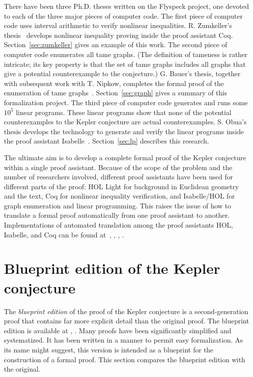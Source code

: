 \documentclass[11pt]{amsart}
\begin{document}
There have been three Ph.D. theses written on the Flyspeck
project, one devoted to each of the three major pieces of computer code.
The first piece of computer code uses interval arithmetic to verify nonlinear inequalities.  R. Zumkeller's thesis~\cite{roland-thesis} develops nonlinear inequality proving inside the proof assistant Coq.  Section~\ref{sec:zumkeller} gives an example of this work.
The second piece of computer code enumerates all tame graphs.
(The definition of tameness is rather intricate; its key property is that the set of tame graphs 
includes all graphs that give a potential counterexample to the conjecture.)
G. Bauer's thesis, together with subsequent 
work with T. Nipkow, completes the formal
proof of the enumeration of tame graphs~\cite{NipkowBS-IJCAR06}.
Section~\ref{sec:graph} gives a summary of this formalization project.
The third piece of computer code generates and runs some $10^5$ linear
programs.   These linear programs show that none of the potential counterexamples
to the Kepler conjecture are actual counterexamples.  S. Obua's thesis develops the
technology to generate and verify the linear programs inside the proof assistant Isabelle~\cite{obua:phd}. 
Section~\ref{sec:lp} describes this research.
 



The ultimate aim is to develop a complete formal proof of the Kepler
conjecture within a single proof assistant.  Because of the scope of 
the problem and the number of researchers involved, different proof
assistants have been used for different parts of the proof:
HOL Light for background
in Euclidean geometry and the text,
Coq for
nonlinear inequality verification, and
Isabelle/HOL for graph enumeration and linear programming.  This raises the issue of how
to translate a formal proof automatically from one proof assistant to another.
Implementations of automated translation among the
proof assistants HOL, Isabelle, and Coq can be found 
at~\cite{obua:import}, \cite{McLaughlin:2006:IJCAR}, \cite{wiedijk:encoding},
\cite{695027}.


\section{Blueprint edition of the Kepler conjecture}
\label{sec:blueprint}

The {\it blueprint edition} of the proof of the Kepler conjecture is a second-generation proof that contains far more explicit detail than the original proof.  The blueprint edition is available at \cite{website:FlyspeckProject}, \cite{hales:2008:collection}.   Many proofs have been significantly simplified and systematized.   It has been written in a manner to permit easy formalization.  As its name might suggest, this version is intended as a blueprint for the construction of a formal proof.
This section 
compares the blueprint edition with the original.
\end{document}
